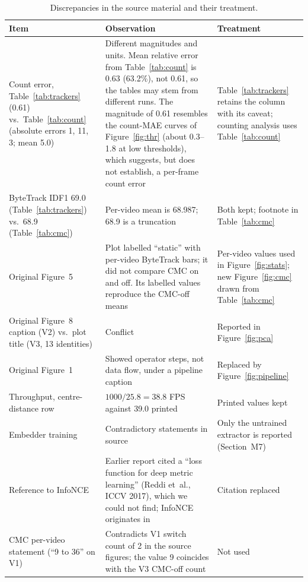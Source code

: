 \documentclass[11pt,a4paper]{article}
\begin{document}
\begin{table}[t]
\caption{Discrepancies in the source material and their treatment.}\label{tab:disc}
\centering\normalsize
\begin{tabular}{p{4.2cm}p{5.2cm}p{4.5cm}}
\toprule
Item & Observation & Treatment\\
\midrule
Count error, Table~\ref{tab:trackers} (0.61) vs.\ Table~\ref{tab:count} (absolute errors 1, 11, 3; mean 5.0) & Different magnitudes and units. Mean relative error from Table~\ref{tab:count} is 0.63 (63.2\%), not 0.61, so the tables may stem from different runs. The magnitude of 0.61 resembles the count-MAE curves of Figure~\ref{fig:thr} (about 0.3--1.8 at low thresholds), which suggests, but does not establish, a per-frame count error & Table~\ref{tab:trackers} retains the column with its caveat; counting analysis uses Table~\ref{tab:count}\\
ByteTrack IDF1 69.0 (Table~\ref{tab:trackers}) vs.\ 68.9 (Table~\ref{tab:cmc}) & Per-video mean is 68.987; 68.9 is a truncation & Both kept; footnote in Table~\ref{tab:cmc}\\
Original Figure~5 & Plot labelled ``static'' with per-video ByteTrack bars; it did not compare CMC on and off. Its labelled values reproduce the CMC-off means & Per-video values used in Figure~\ref{fig:stats}; new Figure~\ref{fig:cmc} drawn from Table~\ref{tab:cmc}\\
Original Figure~8 caption (V2) vs.\ plot title (V3, 13 identities) & Conflict & Reported in Figure~\ref{fig:pca}\\
Original Figure~1 & Showed operator steps, not data flow, under a pipeline caption & Replaced by Figure~\ref{fig:pipeline}\\
Throughput, centre-distance row & $1000/25.8=38.8$ FPS against 39.0 printed & Printed values kept\\
Embedder training & Contradictory statements in source & Only the untrained extractor is reported (Section~M7)\\
Reference to InfoNCE & Earlier report cited a ``loss function for deep metric learning'' (Reddi et~al., ICCV 2017), which we could not find; InfoNCE originates in~\cite{oord2018cpc} & Citation replaced\\
CMC per-video statement (``9 to 36'' on V1) & Contradicts V1 switch count of 2 in the source figures; the value 9 coincides with the V3 CMC-off count & Not used\\
\bottomrule
\end{tabular}
\end{table}
\end{document}
